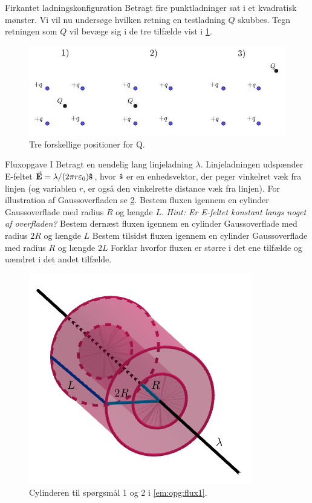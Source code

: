 \documentclass[crop=false, class=memoir]{standalone}
\begin{document}
\begin{opgave}[1]{Firkantet ladningskonfiguration}
Betragt fire punktladninger sat i et kvadratisk mønster. Vi vil nu undersøge hvilken retning en testladning $Q$ skubbes. Tegn retningen som $Q$ vil bevæge sig i de tre tilfælde vist i \cref{em:fig:ladning_i_firkant}.
\begin{figure}[]
    \centering
    \includegraphics[width=.9\textwidth]{Elektro/Elekfig/firkant.JPG}
    \caption{Tre forskellige positioner for Q.}
    \label{em:fig:ladning_i_firkant}
\end{figure}
\end{opgave}

\begin{opgave}[2]{Fluxopgave I} \label{em:opg:flux1}%
Betragt en uendelig lang linjeladning $\lambda$. Linjeladningen udspænder E-feltet $\va{E}=\lambda/(2\pi r \varepsilon_0)\vu{s}$, hvor $\vu{s}$ er en enhedsvektor, der peger vinkelret væk fra linjen (og variablen $r$, er også den vinkelrette distance væk fra linjen). For illustration af Gaussoverfladen se \cref{em:fig:flux1}.
\opg Bestem fluxen igennem en cylinder Gaussoverflade med radius $R$ og længde $L$. \emph{Hint: Er E-feltet konstant langs noget af overfladen?}
\opg Bestem dernæst fluxen igennem en cylinder Gaussoverflade med radius $2R$ og længde $L$
\opg Bestem tilsidst fluxen igennem en cylinder Gaussoverflade med radius $R$ og længde $2L$
\opg Forklar hvorfor fluxen er større i det ene tilfælde og uændret i det andet tilfælde.
    \begin{figure}[]
        \centering
        \includegraphics[width=.52\textwidth]{Elektro/Elekfig/cylinder.PNG}
        \caption{Cylinderen til spørgsmål 1 og 2 i \cref{em:opg:flux1}.}
        \label{em:fig:flux1}
    \end{figure}
\end{opgave}
\end{document}
